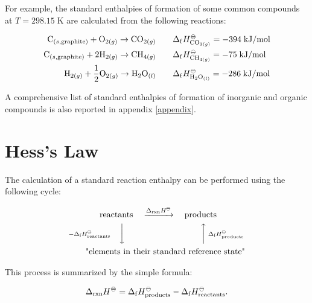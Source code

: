 \documentclass[
  9pt,
]{extbook}
\theoremstyle{definition}
\theoremstyle{definition}
\theoremstyle{definition}
\theoremstyle{definition}
\theoremstyle{remark}
\begin{document}
For example, the standard enthalpies of formation of some common compounds at \(T = 298.15 \; \mathrm{K}\) are calculated from the following reactions:

\begin{equation}
\begin{aligned}
  \mathrm{C}_{(s,\text{graphite})}+\mathrm{O}_{2(g)} \rightarrow \mathrm{CO}_{2(g)} \qquad & \Delta_{\mathrm{f}} H_{\mathrm{CO}_{2(g)}}^{-\kern-6pt{\ominus}\kern-6pt-}= -394 \; \text{kJ/mol} \\
   \mathrm{C}_{(s,\text{graphite})}+2 \mathrm{H}_{2(g)} \rightarrow \mathrm{CH}_{4(g)} \qquad & \Delta_{\mathrm{f}} H_{\mathrm{CH}_{4(g)}}^{-\kern-6pt{\ominus}\kern-6pt-}= -75 \; \text{kJ/mol} \\ 
   \mathrm{H}_{2(g)}+\frac{1}{2} \mathrm{O}_{2(g)} \rightarrow \mathrm{H}_2 \mathrm{O}_{(l)} \qquad & \Delta_{\mathrm{f}} H_{\mathrm{H}_2 \mathrm{O}_{(l)}}^{-\kern-6pt{\ominus}\kern-6pt-}= -286 \; \text{kJ/mol} 
\end{aligned}
\label{eq:someDfH}
\end{equation}

A comprehensive list of standard enthalpies of formation of inorganic and organic compounds is also reported in appendix \ref{appendix}.

\section{Hess's Law}\label{hessslaw}

The calculation of a standard reaction enthalpy can be performed using the following cycle:

\begin{equation}
\begin{aligned}
 \text{reactants} & \quad \xrightarrow{\Delta_{\text{rxn}} H^{-\kern-6pt{\ominus}\kern-6pt-}} \quad \text{products} \\
\scriptstyle{-\Delta_{\text{f}} H_{\text{reactants}}^{-\kern-6pt{\ominus}\kern-6pt-}} \quad \bigg\downarrow \quad & \qquad \qquad \qquad \qquad \scriptstyle{\bigg\uparrow  \; \Delta_{\text{f}} H_{\text{products}}^{-\kern-6pt{\ominus}\kern-6pt-}} \\
 \text{"elements in } & \text{their standard reference state"}
\end{aligned}
\label{eq:Hesscycle}
\end{equation}

This process is summarized by the simple formula:

\begin{equation}
  \Delta_{\text{rxn}} H^{-\kern-6pt{\ominus}\kern-6pt-}= \Delta_{\mathrm{f}} H_{\text{products}}^{-\kern-6pt{\ominus}\kern-6pt-}- \Delta_{\mathrm{f}} H_{\text{reactants}}^{-\kern-6pt{\ominus}\kern-6pt-}.
  \label{eq:Hess1}
\end{equation}
\end{document}
